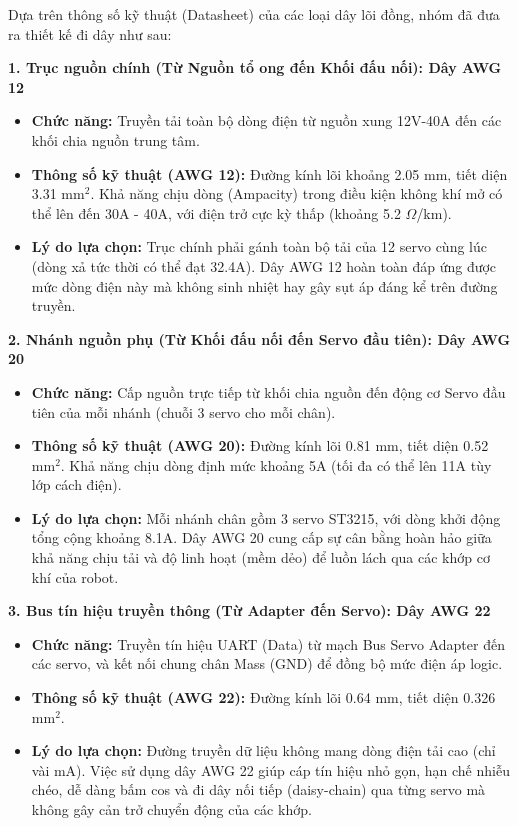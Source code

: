 Dựa trên thông số kỹ thuật (Datasheet) của các loại dây lõi đồng, nhóm đã đưa ra thiết kế đi dây như sau:

\textbf{1. Trục nguồn chính (Từ Nguồn tổ ong đến Khối đấu nối): Dây AWG 12}
\begin{itemize}
    \item \textbf{Chức năng:} Truyền tải toàn bộ dòng điện từ nguồn xung 12V-40A đến các khối chia nguồn trung tâm.
    \item \textbf{Thông số kỹ thuật (AWG 12):} Đường kính lõi khoảng 2.05 mm, tiết diện 3.31 mm$^2$. Khả năng chịu dòng (Ampacity) trong điều kiện không khí mở có thể lên đến 30A - 40A, với điện trở cực kỳ thấp (khoảng 5.2 $\Omega$/km).
    \item \textbf{Lý do lựa chọn:} Trục chính phải gánh toàn bộ tải của 12 servo cùng lúc (dòng xả tức thời có thể đạt 32.4A). Dây AWG 12 hoàn toàn đáp ứng được mức dòng điện này mà không sinh nhiệt hay gây sụt áp đáng kể trên đường truyền.
\end{itemize}

\textbf{2. Nhánh nguồn phụ (Từ Khối đấu nối đến Servo đầu tiên): Dây AWG 20}
\begin{itemize}
    \item \textbf{Chức năng:} Cấp nguồn trực tiếp từ khối chia nguồn đến động cơ Servo đầu tiên của mỗi nhánh (chuỗi 3 servo cho mỗi chân).
    \item \textbf{Thông số kỹ thuật (AWG 20):} Đường kính lõi 0.81 mm, tiết diện 0.52 mm$^2$. Khả năng chịu dòng định mức khoảng 5A (tối đa có thể lên 11A tùy lớp cách điện).
    \item \textbf{Lý do lựa chọn:} Mỗi nhánh chân gồm 3 servo ST3215, với dòng khởi động tổng cộng khoảng 8.1A. Dây AWG 20 cung cấp sự cân bằng hoàn hảo giữa khả năng chịu tải và độ linh hoạt (mềm dẻo) để luồn lách qua các khớp cơ khí của robot.
\end{itemize}

\textbf{3. Bus tín hiệu truyền thông (Từ Adapter đến Servo): Dây AWG 22}
\begin{itemize}
    \item \textbf{Chức năng:} Truyền tín hiệu UART (Data) từ mạch Bus Servo Adapter đến các servo, và kết nối chung chân Mass (GND) để đồng bộ mức điện áp logic.
    \item \textbf{Thông số kỹ thuật (AWG 22):} Đường kính lõi 0.64 mm, tiết diện 0.326 mm$^2$. 
    \item \textbf{Lý do lựa chọn:} Đường truyền dữ liệu không mang dòng điện tải cao (chỉ vài mA). Việc sử dụng dây AWG 22 giúp cáp tín hiệu nhỏ gọn, hạn chế nhiễu chéo, dễ dàng bấm cos và đi dây nối tiếp (daisy-chain) qua từng servo mà không gây cản trở chuyển động của các khớp.
\end{itemize}

